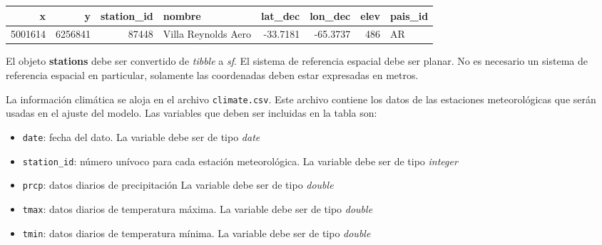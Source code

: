 \documentclass[
  12pt]{article}
\newenvironment{Shaded}{}{}
\newcommand{\CommentTok}[1]{\textcolor[rgb]{0.38,0.63,0.69}{\textit{#1}}}
\newcommand{\DataTypeTok}[1]{\textcolor[rgb]{0.56,0.13,0.00}{#1}}
\newcommand{\DecValTok}[1]{\textcolor[rgb]{0.25,0.63,0.44}{#1}}
\newcommand{\KeywordTok}[1]{\textcolor[rgb]{0.00,0.44,0.13}{\textbf{#1}}}
\newcommand{\NormalTok}[1]{#1}
\newcommand{\OperatorTok}[1]{\textcolor[rgb]{0.40,0.40,0.40}{#1}}
\newcommand{\StringTok}[1]{\textcolor[rgb]{0.25,0.44,0.63}{#1}}
\providecommand{\tightlist}{%
  \setlength{\itemsep}{0pt}\setlength{\parskip}{0pt}}
\begin{document}
\begin{table}[H]
\centering
\begin{tabular}{rrrlrrrl}
\toprule
x & y & station\_id & nombre & lat\_dec & lon\_dec & elev & pais\_id\\
\midrule
5001614 & 6256841 & 87448 & Villa Reynolds Aero & -33.7181 & -65.3737 & 486 & AR\\
\bottomrule
\end{tabular}
\end{table}

El objeto \textbf{stations} debe ser convertido de \emph{tibble} a \emph{sf}. El sistema de referencia espacial debe ser planar. No es necesario un sistema de referencia espacial en particular, solamente las coordenadas deben estar expresadas en metros.

\begin{Shaded}
\end{Shaded}

La información climática se aloja en el archivo \texttt{climate.csv}. Este archivo contiene los datos de las estaciones meteorológicas que serán usadas en el ajuste del modelo. Las variables que deben ser incluidas en la tabla son:

\begin{itemize}
\tightlist
\item
  \texttt{date}: fecha del dato. La variable debe ser de tipo \emph{date}
\item
  \texttt{station\_id}: número unívoco para cada estación meteorológica. La variable debe ser de tipo \emph{integer}
\item
  \texttt{prcp}: datos diarios de precipitación La variable debe ser de tipo \emph{double}
\item
  \texttt{tmax}: datos diarios de temperatura máxima. La variable debe ser de tipo \emph{double}
\item
  \texttt{tmin}: datos diarios de temperatura mínima. La variable debe ser de tipo \emph{double}
\end{itemize}
\end{document}

